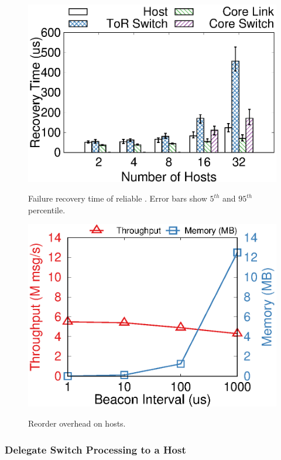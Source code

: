 \begin{figure}[t]
\begin{minipage}[]{.32\textwidth}
		\includegraphics[width=\textwidth]{gnuplot/failure_recovery.eps}
		\caption{Failure recovery time of reliable \sys{}. Error bars show $5^{th}$ and $95^{th}$ percentile.}
		\label{fig:failure-recovery}
		\includegraphics[width=\textwidth]{gnuplot/reorder_receiver.eps}
		\caption{Reorder overhead on hosts.}
		\label{fig:reorder-overhead}
	\end{minipage}
	\vspace{-10pt}
\end{figure}


\subsubsection{Delegate Switch Processing to a Host}
\label{sec:end-host}

